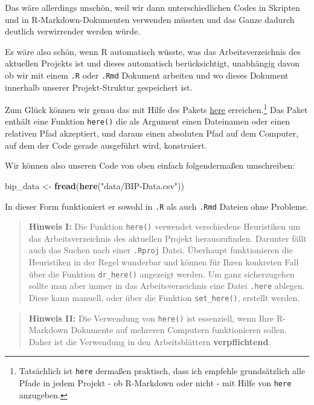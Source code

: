 \documentclass[]{book}
\newenvironment{Shaded}{\begin{snugshade}}{\end{snugshade}}
\newcommand{\KeywordTok}[1]{\textcolor[rgb]{0.13,0.29,0.53}{\textbf{#1}}}
\newcommand{\StringTok}[1]{\textcolor[rgb]{0.31,0.60,0.02}{#1}}
\newcommand{\NormalTok}[1]{#1}
\let\rmarkdownfootnote\footnote%
\def\footnote{\protect\rmarkdownfootnote}
\begin{document}
Das wäre allerdings unschön, weil wir dann unterschiedlichen Codes in
Skripten und in R-Markdown-Dokumenten verwenden müssten und das Ganze
dadurch deutlich verwirrender werden würde.

Es wäre also schön, wenn R automatisch wüsste, was das
Arbeitsverzeichnis des aktuellen Projekts ist und dieses automatisch
berücksichtigt, unabhängig davon ob wir mit einem \texttt{.R} oder
\texttt{.Rmd} Dokument arbeiten und wo dieses Dokument innerhalb unserer
Projekt-Struktur gespeichert ist.

Zum Glück können wir genau das mit Hilfe des Pakets
\href{https://github.com/jennybc/here_here}{here} erreichen.\footnote{Tatsächlich
  ist \texttt{here} dermaßen praktisch, dass ich empfehle grundsätzlich
  alle Pfade in jedem Projekt - ob R-Markdown oder nicht - mit Hilfe von
  \texttt{here} anzugeben.} Das Paket enthält eine Funktion
\texttt{here()} die als Argument einen Dateinamen oder einen relativen
Pfad akzeptiert, und daraus einen absoluten Pfad auf dem Computer, auf
dem der Code gerade ausgeführt wird, konstruiert.

Wir können also unseren Code von oben einfach folgendermaßen
umschreiben:

\begin{Shaded}
\begin{Highlighting}[]
\NormalTok{bip_data <-}\StringTok{ }\KeywordTok{fread}\NormalTok{(}\KeywordTok{here}\NormalTok{(}\StringTok{"data/BIP-Data.csv"}\NormalTok{))}
\end{Highlighting}
\end{Shaded}

In dieser Form funktioniert er sowohl in \texttt{.R} als auch
\texttt{.Rmd} Dateien ohne Probleme.

\begin{quote}
\textbf{Hinweis I:} Die Funktion \texttt{here()} verwendet verschiedene
Heuristiken um das Arbeitsverzeichnis des aktuellen Projekt
herauszufinden. Darunter fällt auch das Suchen nach einer
\texttt{.Rproj} Datei. Überhaupt funktionieren die Heuristiken in der
Regel wunderbar und können für Ihren konkreten Fall über die Funktion
\texttt{dr\_here()} angezeigt werden. Um ganz sicherzugehen sollte man
aber immer in das Arbeitsverzeichnis eine Datei \texttt{.here} ablegen.
Diese kann manuell, oder über die Funktion \texttt{set\_here()},
erstellt werden.
\end{quote}

\begin{quote}
\textbf{Hinweis II:} Die Verwendung von \texttt{here()} ist essenziell,
wenn Ihre R-Markdown Dokumente auf mehreren Computern funktionieren
sollen. Daher ist die Verwendung in den Arbeitsblättern
\textbf{verpflichtend}.
\end{quote}
\end{document}

